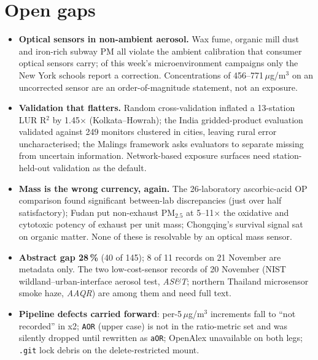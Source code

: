 \documentclass[10pt]{article}
\begin{document}
\vspace{2mm}
\section*{\sffamily\bfseries\color{Deep}Open gaps}
\vspace{-1.5mm}{\color{Teal}\rule{\linewidth}{1.1pt}}\vspace{2.5mm}

\footnotesize
\begin{itemize}
\item \textbf{Optical sensors in non-ambient aerosol.} Wax fume, organic mill dust and iron-rich subway PM all violate
the ambient calibration that consumer optical sensors carry; of this week's microenvironment campaigns only the New York
schools report a correction. Concentrations of 456--771\,$\mu$g/m$^3$ on an uncorrected sensor are an order-of-magnitude
statement, not an exposure.

\item \textbf{Validation that flatters.} Random cross-validation inflated a 13-station LUR R$^2$ by 1.45$\times$
(Kolkata--Howrah); the India gridded-product evaluation validated against 249 monitors clustered in cities, leaving
rural error uncharacterised; the Malings framework asks evaluators to separate missing from uncertain information.
Network-based exposure surfaces need station-held-out validation as the default.

\item \textbf{Mass is the wrong currency, again.} The 26-laboratory ascorbic-acid OP comparison found significant
between-lab discrepancies (just over half satisfactory); Fudan put non-exhaust PM$_{2.5}$ at 5--11$\times$ the
oxidative and cytotoxic potency of exhaust per unit mass; Chongqing's survival signal sat on organic matter. None of
these is resolvable by an optical mass sensor.

\item \textbf{Abstract gap 28\,\%} (40 of 145); 8 of 11 records on
21 November are metadata only. The two low-cost-sensor records of 20 November (NIST wildland--urban-interface aerosol
test, \textit{AS\&T}; northern Thailand microsensor smoke haze, \textit{AAQR}) are among them and need full text.

\item \textbf{Pipeline defects carried forward}: per-5\,$\mu$g/m$^3$ increments fall to ``not recorded'' in x2;
\texttt{AOR} (upper case) is not in the ratio-metric set and was silently dropped until rewritten as \texttt{aOR};
OpenAlex unavailable on both legs; \texttt{.git} lock debris on the delete-restricted mount.
\end{itemize}
\end{document}
